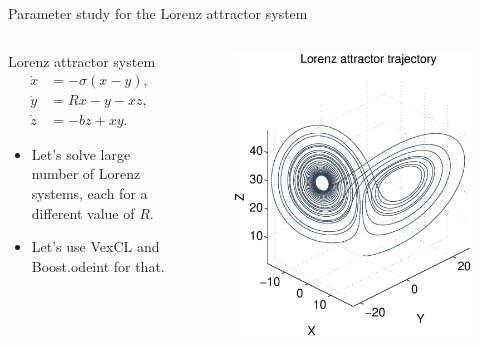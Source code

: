 \documentclass[@BEAMER_OPTIONS@]{beamer}
\begin{document}
\begin{frame}[fragile]{Parameter study for the Lorenz attractor system}
    \begin{columns}
        \begin{column}{0.6\textwidth}
            \begin{block}{Lorenz attractor system}
                \vspace{-1\baselineskip}
                \begin{align*}
                    \dot{x} &= -\sigma \left( x - y \right), \\
                    \dot{y} &= R x - y - xz, \\
                    \dot{z} &= -bz + xy.
                    \label{eq:lorenz}
                \end{align*}
            \end{block}
            \begin{itemize}
                \item Let's solve large number of Lorenz systems, each
                    for a different value of $R$.
                \item Let's use VexCL and Boost.odeint for that.
            \end{itemize}
        \end{column}
        \begin{column}{0.4\textwidth}
            \begin{figure}
                \includegraphics[width=\textwidth]{lorenz}
            \end{figure}
        \end{column}
    \end{columns}
\end{frame}
\end{document}
